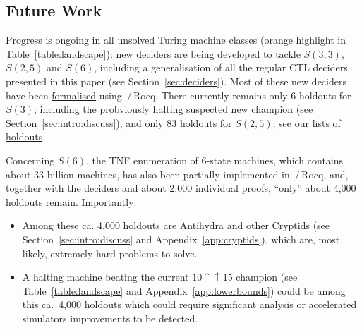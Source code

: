 \documentclass[a4paper,british]{article}
\theoremstyle{definition} %
\numberwithin{equation}{section}
\theoremstyle{definition} %
\begin{document}
















% 

\subsection{Future Work}

Progress is ongoing in all unsolved Turing machine classes (orange highlight in Table~\ref{table:landscape}): new deciders are being developed to tackle $S(3,3)$, $S(2,5)$ and $S(6)$, including a generalisation of all the regular CTL deciders presented in this paper (see Section~\ref{sec:deciders}). Most of these new deciders have been  \href{https://github.com/ccz181078/busycoq/tree/BB6/verify}{formalised} using \Coq\,/\,Rocq. There currently remains only $6$ holdouts for $S(3)$, including the probviously halting suspected new champion (see Section~\ref{sec:intro:discuss}), and only $83$ holdouts for $S(2,5)$; see our \href{https://wiki.bbchallenge.org/wiki/Holdouts_lists}{lists of holdouts}.

Concerning $S(6)$, the TNF enumeration of 6-state machines, which contains about 33 billion machines, has also been partially implemented in \Coq\,/\,Rocq, and, together with the deciders and about 2,000 individual proofs, ``only'' about 4,000 holdouts remain. Importantly:
\begin{itemize}[label=--]
    \item Among these ca. 4,000 holdouts are Antihydra and other Cryptids (see Section~\ref{sec:intro:discuss} and Appendix~\ref{app:cryptids}), which are, most likely, extremely hard problems to solve.
    \item A halting machine beating the current $10\uparrow\uparrow15$ champion (see Table~\ref{table:landscape} and Appendix~\ref{app:lowerbounds}) could be among this ca.~4,000 holdouts which could require significant analysis or accelerated simulators improvements to be detected.
\end{itemize}
\end{document}
